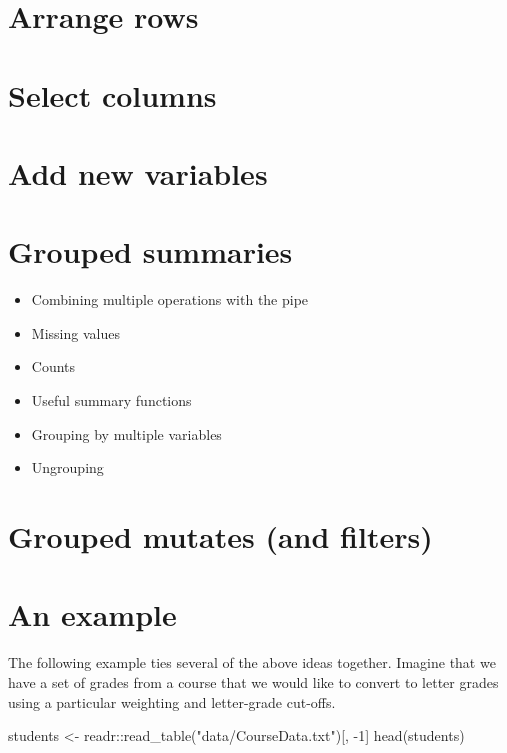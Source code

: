 \documentclass[
]{book}
\newenvironment{Shaded}{\begin{snugshade}}{\end{snugshade}}
\newcommand{\DecValTok}[1]{\textcolor[rgb]{0.00,0.00,0.81}{#1}}
\newcommand{\FunctionTok}[1]{\textcolor[rgb]{0.00,0.00,0.00}{#1}}
\newcommand{\NormalTok}[1]{#1}
\newcommand{\OtherTok}[1]{\textcolor[rgb]{0.56,0.35,0.01}{#1}}
\newcommand{\SpecialCharTok}[1]{\textcolor[rgb]{0.00,0.00,0.00}{#1}}
\newcommand{\StringTok}[1]{\textcolor[rgb]{0.31,0.60,0.02}{#1}}
\providecommand{\tightlist}{%
  \setlength{\itemsep}{0pt}\setlength{\parskip}{0pt}}
\begin{document}
\hypertarget{arrange-rows}{%
\section{Arrange rows}\label{arrange-rows}}

\hypertarget{select-columns}{%
\section{Select columns}\label{select-columns}}

\hypertarget{add-new-variables}{%
\section{Add new variables}\label{add-new-variables}}

\hypertarget{grouped-summaries}{%
\section{Grouped summaries}\label{grouped-summaries}}

\begin{itemize}
\tightlist
\item
  Combining multiple operations with the pipe
\item
  Missing values
\item
  Counts
\item
  Useful summary functions
\item
  Grouping by multiple variables
\item
  Ungrouping
\end{itemize}

\hypertarget{grouped-mutates-and-filters}{%
\section{Grouped mutates (and filters)}\label{grouped-mutates-and-filters}}

\hypertarget{an-example}{%
\section{An example}\label{an-example}}

The following example ties several of the above ideas together. Imagine that we have a set of grades from a course that we would like to convert to letter grades using a particular weighting and letter-grade cut-offs.

\begin{Shaded}
\begin{Highlighting}[]
\NormalTok{students }\OtherTok{\textless{}{-}}\NormalTok{ readr}\SpecialCharTok{::}\FunctionTok{read\_table}\NormalTok{(}\StringTok{"data/CourseData.txt"}\NormalTok{)[, }\SpecialCharTok{{-}}\DecValTok{1}\NormalTok{]}
\FunctionTok{head}\NormalTok{(students)}
\end{Highlighting}
\end{Shaded}
\end{document}
